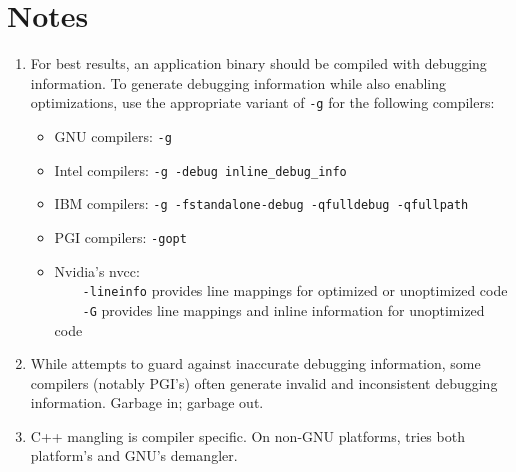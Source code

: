 \documentclass[english]{article}
\begin{document}
\section{Notes}

\begin{enumerate}

\item For best results, an application binary should be compiled with debugging information.
To generate debugging information while also enabling optimizations,
use the appropriate variant of \verb+-g+ for the following compilers:
\begin{itemize}
\item GNU compilers: \verb+-g+
\item Intel compilers: \verb+-g -debug inline_debug_info+
\item IBM compilers: \verb+-g -fstandalone-debug -qfulldebug -qfullpath+
\item PGI compilers: \verb+-gopt+
\item Nvidia's nvcc: \\
~~~~\verb+-lineinfo+ provides line mappings for optimized or unoptimized code\\
~~~~\verb+-G+ provides line mappings and inline information for unoptimized code
\end{itemize}

\item While  attempts to guard against inaccurate debugging information,
some compilers (notably PGI's) often generate invalid and inconsistent debugging information.
Garbage in; garbage out.

\item C++ mangling is compiler specific. On non-GNU platforms, 
tries both platform's and GNU's demangler.

\end{enumerate}



\end{document}
